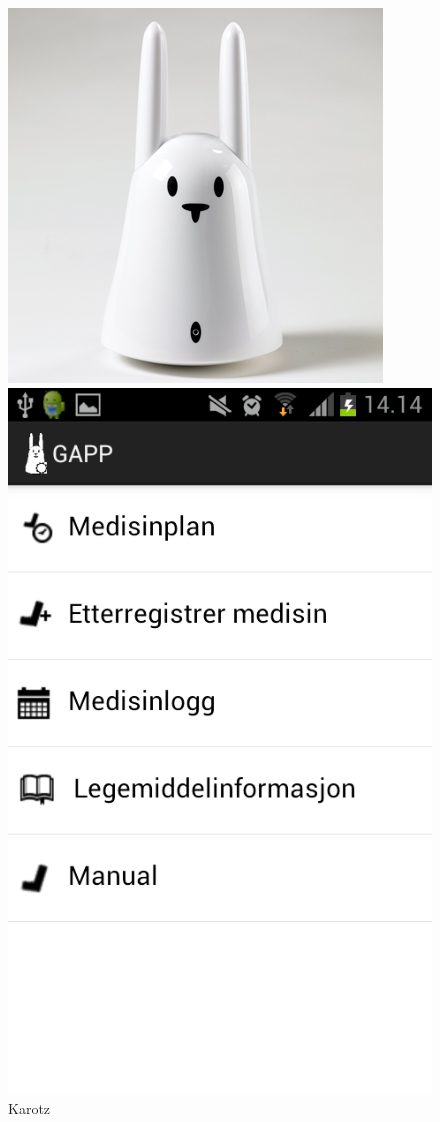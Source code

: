 \begin{figure}
	\begin{minipage}[b]{0.4\linewidth}
		\centering
			\includegraphics[width=0.20\paperwidth]{Pictures/karotz.jpg}
		\caption{Karotz}
		\label{fig:karotz}
	\end{minipage}
	\hspace{3cm}
	\begin{minipage}[b]{0.4\linewidth}
	\centering
		\includegraphics[width=0.20\paperwidth]{Pictures/app-screenshots/gapp_main_menu.png}

\end{minipage}
\end{figure}
